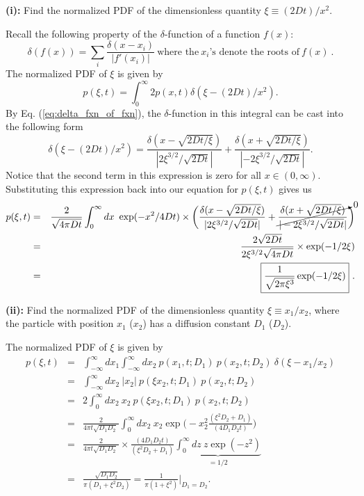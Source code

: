 \textbf{(i):} Find the normalized PDF of the dimensionless quantity $\xi \equiv (2Dt)/x^2$. 

Recall the following property of the $\delta$-function of a function $f(x)$:
\begin{equation}
\boxed{\delta(f(x)) = \sum_{i} \frac{\delta(x-x_i)}{|f'(x_i)|}~\text{where the}~x_i\text{'s denote the roots of}~f(x)}~. \label{eq:delta_fxn_of_fxn}
\end{equation}
The normalized PDF of $\xi$ is given by
\begin{equation}
p(\xi, t) = \int_{0}^{\infty} 2 p(x, t) \delta(\xi-(2Dt)/x^2). \nonumber
\end{equation}
By Eq. (\ref{eq:delta_fxn_of_fxn}), the $\delta$-function in this integral can be cast into the following form
\begin{equation}
\delta(\xi-(2Dt)/x^2) = \frac{\delta(x-\sqrt{2Dt/\xi})}{|2 \xi^{3/2}/\sqrt{2Dt}|} + \frac{\delta(x+\sqrt{2Dt/\xi})}{|-2 \xi^{3/2}/\sqrt{2Dt}|}. \nonumber
\end{equation}
Notice that the second term in this expression is zero for all $x\in(0, \infty)$. Substituting this expression back into our equation for $p(\xi, t)$ gives us
\begin{eqnarray}
p(\xi, t) &=& \frac{2}{\sqrt{4 \pi D t}} \int_{0}^{\infty} dx~\exp(-x^2/4Dt)\times \bigg(\frac{\delta(x-\sqrt{2Dt/\xi})}{|2 \xi^{3/2}/\sqrt{2Dt}|} + \cancelto{0}{\frac{\delta(x+\sqrt{2Dt/\xi})}{|-2 \xi^{3/2}/\sqrt{2Dt}|}}\bigg)%
\nonumber \\
&=& \frac{2\sqrt{2 D t}}{ 2 \xi^{3/2} \sqrt{4 \pi D t}} \times \exp(-1/2\xi) \nonumber \\
&=& \boxed{ \frac{1}{\sqrt{2 \pi \xi^3}} \exp(-1/2\xi)}~.
\end{eqnarray}

\textbf{(ii):} Find the normalized PDF of the dimensionless quantity $\xi \equiv x_1/x_2$, where the particle with position $x_1$ ($x_2$) has a diffusion constant $D_1$ ($D_2$).

The normalized PDF of $\xi$ is given by
\begin{eqnarray}
p(\xi, t) &=&  \int_{-\infty}^{\infty} dx_1 \int_{-\infty}^{\infty} dx_2~p(x_1, t;D_1)~p(x_2, t; D_2) ~\delta(\xi-x_1/x_2) \nonumber \\
&=& \int_{-\infty}^{\infty} dx_2~|x_2|~p(\xi x_2, t;D_1)~p(x_2, t;D_2) \nonumber \\
&=& 2 \int_{0}^{\infty} dx_2~x_2~p(\xi x_2, t;D_1)~p(x_2, t;D_2) \nonumber \\
&=& \frac{2}{4 \pi t \sqrt{D_1 D_2}~}\int_{0}^{\infty} dx_2~x_2 \exp \bigg( -x_2^2\frac{(\xi^2 D_2 + D_1)}{(4 D_1 D_2 t)} \bigg) \nonumber \\
&=& \frac{2}{4 \pi t \sqrt{D_1 D_2}~} \times \frac{(4 D_1 D_2 t)}{(\xi^2 D_2 + D_1) } \underbrace{\int_{0}^{\infty} dz ~z \exp(-z^2)}_{=1/2} \nonumber \\
&=& \boxed{\frac{\sqrt{D_1 D_2}}{ \pi(D_1 + \xi^2 D_2)}} = \frac{1}{\pi(1+\xi^2)}\bigg|_{D_1=D_2}.
\end{eqnarray}

